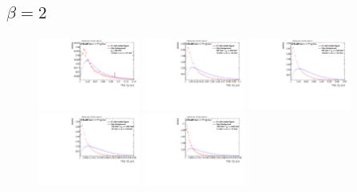 \subsection*{$\beta=2$}
\begin{figure}
\includegraphics[width=0.3\textwidth]{sascha_input/Appendix/Distributions/higgs/distributions/beta2/h_assisted_tj_C2_2_bin1.pdf} \hspace{1mm}
\includegraphics[width=0.3\textwidth]{sascha_input/Appendix/Distributions/higgs/distributions/beta2/h_assisted_tj_C2_2_bin2.pdf} \hspace{4mm}
\includegraphics[width=0.3\textwidth]{sascha_input/Appendix/Distributions/higgs/distributions/beta2/h_assisted_tj_C2_2_bin3.pdf} 
\bigskip
\includegraphics[width=0.3\textwidth]{sascha_input/Appendix/Distributions/higgs/distributions/beta2/h_assisted_tj_C2_2_bin4.pdf} \hspace{4mm}
\includegraphics[width=0.3\textwidth]{sascha_input/Appendix/Distributions/higgs/distributions/beta2/h_assisted_tj_C2_2_bin5.pdf} 


\end{figure}
